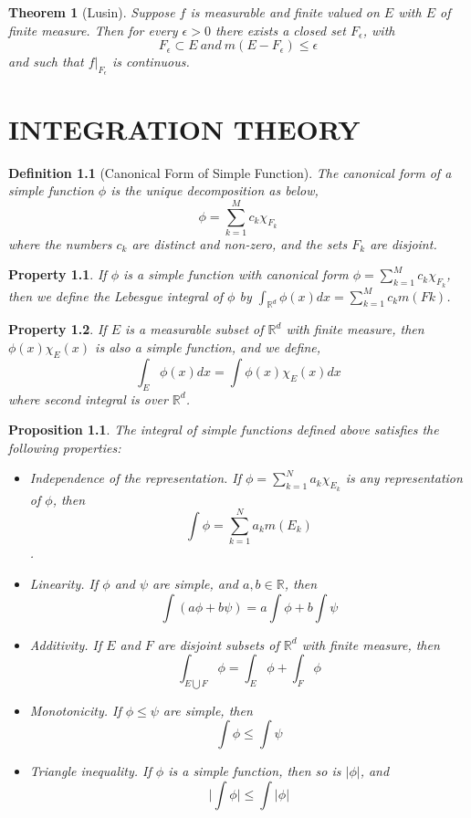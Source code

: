 \documentclass{report}
\newtheorem{thm}{Theorem}
\newtheorem{defn}{Definition}
\newtheorem{prop}{Proposition}
\newtheorem{property}{Property}
\newcommand{\reals}{\mathbb{R}}
\newcommand{\union}{\bigcup}
\newcommand{\vl}{\Big|}
\begin{document}
\begin{thm}[Lusin]
	Suppose $f$ is measurable and finite valued on $E$ with $E$ of finite measure. Then for every $\epsilon > 0$ there exists a closed set $F_\epsilon$, with
	$$F_\epsilon \subset E\ and\ m(E - F_\epsilon) \leq \epsilon$$
	and such that $f|_{F_\epsilon}$ is continuous.
\end{thm}

\chapter{INTEGRATION THEORY}
\begin{defn}[Canonical Form of Simple Function]
	The canonical form of a simple function $\phi$ is the unique decomposition as below,
	$$  \phi = \sum_{k=1}^{M} c_k \chi_{F_k}  $$
	 where the numbers $c_k$ are distinct and non-zero, and the sets $F_k$ are disjoint.
\end{defn}
\begin{property}
	If $\phi$ is a simple function with canonical form $  \phi = \sum_{k=1}^{M} c_k \chi_{F_k}  $, then we define the Lebesgue integral of $\phi$ by $\int_{\reals^d}^{} \phi(x) dx = \sum_{k=1}^{M} c_k m(Fk)$.
\end{property}
\begin{property}
	If $E$ is a measurable subset of $\reals^d$ with finite measure, then $ \phi(x) \chi_E(x)$
	is also a simple function, and we define,
	$$ \int_{E} \phi(x) dx = \int \phi(x) \chi_E(x) dx $$
	where second integral is over $\reals^d$.
\end{property}

\begin{prop}
	The integral of simple functions defined above satisfies the following properties:
	\begin{itemize}
		\item Independence of the representation. If $ \phi = \sum_{k=1}^{N} a_k \chi_{E_k}$ is any representation of $\phi$, then
		$$ \int \phi = \sum_{k=1}^{N} a_k m(E_k) $$.
		\item Linearity. If $\phi$ and $\psi$ are simple, and $a, b \in \reals$, then
		$$\int (a \phi + b \psi) = a \int \phi + b \int \psi $$
		\item Additivity. If $E$ and $F$ are disjoint subsets of $\reals^d$ with finite measure, then
		$$ \int_{E \union F} \phi = \int_{E} \phi + \int_{F} \phi $$
		\item Monotonicity. If $\phi  \leq \psi$ are simple, then
		$$ \int \phi \leq \int \psi$$
		\item Triangle inequality. If $\phi$ is a simple function, then so is $|\phi|$, and
		$$ \vl \int \phi \vl \leq \int \vl \phi \vl  $$
	\end{itemize}
\end{prop}
\end{document}
